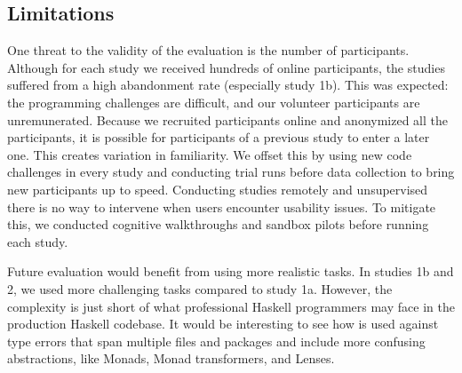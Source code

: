 \subsection{Limitations}

One threat to the validity of the evaluation is the number of participants. Although for each study we received hundreds of online participants, the studies suffered from a high abandonment rate (especially study 1b). This was expected: the programming challenges are difficult, and our volunteer participants are unremunerated. 
Because we recruited participants online and anonymized all the participants, it is possible for participants of a previous study to enter a later one. This creates variation in familiarity. We offset this by using new code challenges in every study and conducting trial runs before data collection to bring new participants up to speed.
Conducting studies remotely and unsupervised there is no way to intervene when users encounter usability issues. To mitigate this, we conducted cognitive walkthroughs and sandbox pilots before running each study.

Future evaluation would benefit from using more realistic tasks. In studies 1b and 2, we used more challenging tasks compared to study 1a. However, the complexity is just short of what professional Haskell programmers may face in the production Haskell codebase. It would be interesting to see how \chameleon{} is used against type errors that span multiple files and packages and include more confusing abstractions, like Monads, Monad transformers, and Lenses.  


